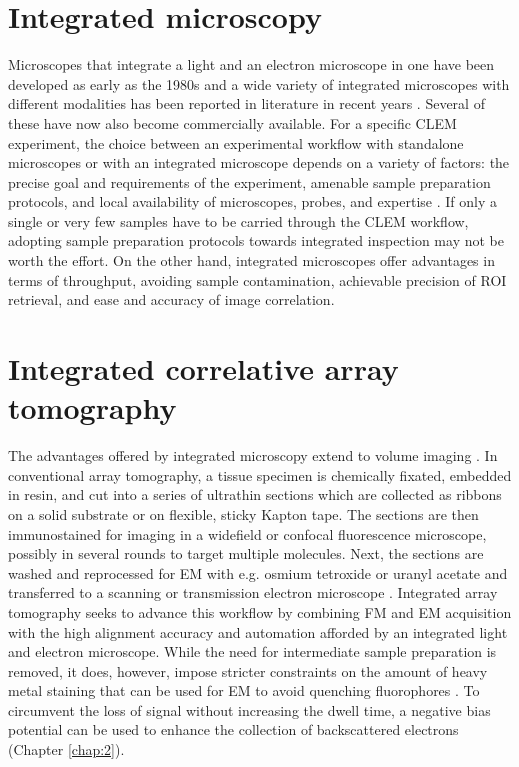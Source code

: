 \section{Integrated microscopy}
\label{sec:1_integrated}

Microscopes that integrate a light and an electron microscope in one have been developed as early as the 1980s and a wide variety of integrated microscopes with different modalities has been reported in literature in recent years \cite{zonnevylle2013integration, timmermans2015contributed}. Several of these have now also become commercially available. For a specific CLEM experiment, the choice between an experimental workflow with standalone microscopes or with an integrated microscope depends on a variety of factors: the precise goal and requirements of the experiment, amenable sample preparation protocols, and local availability of microscopes, probes, and expertise \cite{de2015correlated}. If only a single or very few samples have to be carried through the CLEM workflow, adopting sample preparation protocols towards integrated inspection may not be worth the effort. On the other hand, integrated microscopes offer advantages in terms of throughput, avoiding sample contamination, achievable precision of ROI retrieval, and ease and accuracy of image correlation.


\section{Integrated correlative array tomography}
\label{sec:1_iCAT}

The advantages offered by integrated microscopy extend to volume imaging \cite{peddie2022volume}. In conventional array tomography, a tissue specimen is chemically fixated, embedded in resin, and cut into a series of ultrathin sections which are collected as ribbons on a solid substrate or on flexible, sticky Kapton tape. The sections are then immunostained for imaging in a widefield or confocal fluorescence microscope, possibly in several rounds to target multiple molecules. Next, the sections are washed and reprocessed for EM with e.g. osmium tetroxide or uranyl acetate and transferred to a scanning or transmission electron microscope \cite{micheva2007array, wacker2013array}. Integrated array tomography seeks to advance this workflow by combining FM and EM acquisition with the high alignment accuracy and automation afforded by an integrated light and electron microscope. While the need for intermediate sample preparation is removed, it does, however, impose stricter constraints on the amount of heavy metal staining that can be used for EM to avoid quenching fluorophores \cite{kuipers2015scanning, peddie2017correlative}. To circumvent the loss of signal without increasing the dwell time, a negative bias potential can be used to enhance the collection of backscattered electrons (Chapter \ref{chap:2}).

